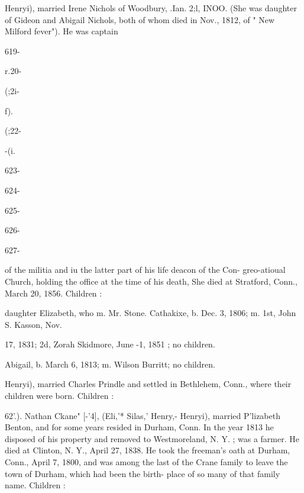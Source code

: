 \documentclass[oneside]{book}
\begin{document}
Henryi), married Irene Nichols of Woodbury, .Ian. 2;l, INOO. 
(She was daughter of Gideon and Abigail Nichols, both of whom 
died in Nov., 1812, of " New Milford fever"). He was captain 



619- 




r.20- 




(;2i- 


 f). 


(;22- 


-(i. 


623- 




624- 




625- 




626- 




627- 






of the militia and iu the latter part of his life deacon of the Con- 
greo-atioual Church, holding the office at the time of his death, 
She died at Stratford, Conn., March 20, 1856. Children : 

daughter Elizabeth, who m. Mr. Stone. 
Cathakixe, b. Dec. 3, 1806; m. 1st, John S. Kasson, Nov. 

17, 1831; 2d, Zorah Skidmore, June -1, 1851 ; no children. 

Abigail, b. March 6, 1813; m. Wilson Burritt; no children. 

Henryi), married Charles Prindle and settled in Bethlehem, 
Conn., where their children were born. Children : 












62'.). Nathan Ckane" [-'4], (Eli,'* Silas,' Henry,- Henryi), 
married P'lizabeth Benton, and for some years resided in Durham, 
Conn. In the year 1813 he disposed of his property and removed 
to Westmoreland, N. Y. ; was a farmer. He died at Clinton, 
N. Y., April 27, 1838. He took the freeman's oath at Durham, 
Conn., April 7, 1800, and was among the last of the Crane 
family to leave the town of Durham, which had been the birth- 
place of so many of that family name. Children : 
\end{document}
